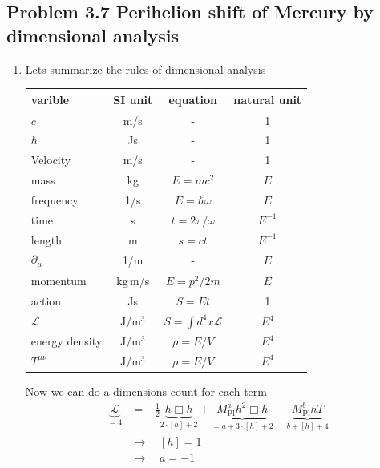 \documentclass[10pt,a4paper]{book}
\theoremstyle{definition}
\begin{document}
\subsection{Problem 3.7 Perihelion shift of Mercury by dimensional analysis}
\begin{enumerate}[label=(\alph*)]
\item Lets summarize the rules of dimensional analysis 

\begin{center}
\begin{tabular}{ lccc } 
 \hline
 varible & SI unit &equation & natural unit \\ 
 \hline\hline
 $c$               & m/s    & -                        & 1        \\
 $\hbar$           & Js     & -                        & 1        \\
 Velocity          & m/s    & -                        & 1      \\
 mass              & kg     & $E=mc^2$                 & $E$      \\
 frequency         & 1/s    & $E=\hbar\omega$          & $E$      \\
 time              & s      & $t=2\pi/\omega$          & $E^{-1}$ \\
 length            & m      & $s=ct$                   & $E^{-1}$ \\
 $\partial_\mu$    & 1/m    & -                        & $E$      \\
 momentum          & kg\,m/s& $E=p^2/2m$               & $E$      \\
 action            & Js     & $S=Et$                   & 1        \\
 $\mathcal{L}$     & J/m$^3$& $S=\int d^4x\mathcal{L}$ & $E^4$    \\
 energy density    & J/m$^3$& $\rho=E/V$               & $E^4$    \\
 $T^{\mu\nu}$      & J/m$^3$& $\rho=E/V$               & $E^4$    \\
 \hline
\end{tabular}
\end{center}
Now we can do a dimensions count for each term
\begin{align}
\underbrace{\mathcal{L}}_{=4}&=-\frac{1}{2}\underbrace{h\Box h}_{2\cdot[h]+2}+ \underbrace{M_\text{Pl}^a h^2\Box h}_{=a+3\cdot[h]+2}-\underbrace{M_\text{Pl}^bhT}_{b+[h]+4}\\
&\rightarrow\quad[h]=1\\
&\rightarrow\quad a=-1\\

\end{align}
\end{enumerate}
\end{document}
